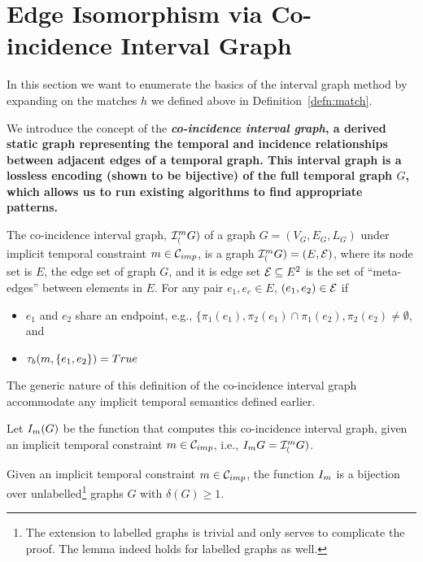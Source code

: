 \section{Edge Isomorphism via Co-incidence Interval Graph}

In this section we want to enumerate the basics of the interval graph method by
expanding on the matches $h$ we defined above in Definition~\ref{defn:match}. 

We introduce the concept of the {\bf {\em co-incidence interval graph}, a
  derived static graph representing the temporal and incidence relationships
  between adjacent edges of a temporal graph. This interval graph is a lossless
  encoding (shown to be bijective) of the full temporal graph $G$, which allows
  us to run existing algorithms to find appropriate patterns.}

\begin{defn}
  \label{def:ci_graph}
  The co-incidence interval graph, $\mathcal{I}_{(}^{m}G)$ of a graph $G =
  (V_G,E_G, L_G)$ under implicit temporal constraint $m \in \mathcal{C}_{imp}$, is a
  graph $\mathcal{I}_{(}^{m}G) = (E, \mathcal{E})$, where its node set is $E$, the edge
  set of graph $G$, and it is edge set $\mathcal{E} \subseteq E^2$ is the set of
  ``meta-edges'' between elements in $E$. For any pair $e_1, e_e \in E$,
  $(e_1,e_2) \in \mathcal{E}$ if
  \begin{itemize}
    \item $e_1$ and $e_2$ share an endpoint, e.g., $\{\pi_1(e_1), \pi_2(e_1)
      \cap \pi_1(e_2), \pi_2(e_2) \neq \emptyset$, and
    \item $\tau_b(m,\{e_1,e_2\}) = True$
  \end{itemize}
\end{defn}

The generic nature of this definition of the co-incidence interval graph
accommodate any implicit temporal semantics defined earlier.



 Let $I_{m}(G)$ be the function that computes this co-incidence
 interval graph, given an implicit temporal constraint $m \in \mathcal{C}_{imp}$,
 i.e., $I_{m}{G} = \mathcal{I}_{(}^{m}G)$.

\begin{lemma}
  \label{lem:ci_biject}
  Given an implicit temporal constraint $m \in \mathcal{C}_{imp}$, the function
  $I_{m}$ is a bijection over unlabelled\footnote{The extension to
    labelled graphs is trivial and only serves to complicate the proof. The
    lemma indeed holds for labelled graphs as well.}  graphs $G$ with $\delta(G)
  \geq 1$.
\end{lemma}


